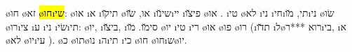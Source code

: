 	





\o{חו} \o{זא} \hl{\o{חו}\i{שי}}:  \o{או}  \i{א} \i{תי}\u{קו} \o{או}, \u{שׂו}  \i{שי}\u{נו}\i{יי} \i{פי}\u{צו} \o{או} .  \i{טי} \o{לא} \i{ני} \i{חי}\i{תי},   \u{מו}\i{ני} \o{שׂו}   \o{רו}\i{צי} \i{ע}  \i{ני} \i{שׂי}\i{תי}: \o{יו}, \i{בי}\u{צו}, \i{סי}\u{מו}.  \u{מו}    \o{יו} \i{טי} \i{רי} \o{או} \o{פו} \o{רו} (\i{ת}\u{דו} \i{ל}\o{רוא} ***ר\i{בי}, \i{א}  \o{לא} \o{יו}\i{עי} ).  \o{כ} \o{תו}\o{נו} \i{ה}\i{תי}   \i{כי}  \o{חו} \o{חו}\i{ש}\o{יו}.

